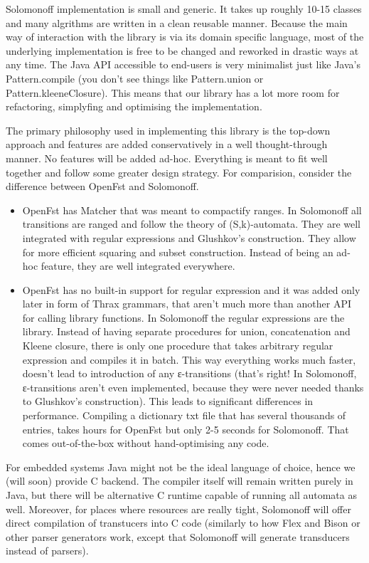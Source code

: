 \documentclass[oneside,polski,logo]{amuthesis}
\begin{document}
\begin{streszczenie}
Solomonoff implementation is small and generic. It takes up roughly 10-15 classes and many algrithms are written in a clean reusable manner. Because the main way of interaction with the library is via its domain specific language, most of the underlying implementation is free to be changed and reworked in drastic ways at any time. The Java API accessible to end-users is very minimalist just like Java's Pattern.compile (you don't see things like Pattern.union or Pattern.kleeneClosure). This means that our library has a lot more room for refactoring, simplyfing and optimising the implementation.


The primary philosophy used in implementing this library is the top-down approach and features are added conservatively in a well thought-through manner. No features will be added ad-hoc. Everything is meant to fit well together and follow some greater design strategy. For comparision, consider the difference between OpenFst and Solomonoff.


\begin{itemize}
	\item OpenFst has Matcher that was meant to compactify ranges. In Solomonoff all transitions are ranged and follow the theory of (S,k)-automata. They are well integrated with regular expressions and Glushkov's construction. They allow for more efficient squaring and subset construction. Instead of being an ad-hoc feature, they are well integrated everywhere.
	
	\item OpenFst has no built-in support for regular expression and it was added only later in form of Thrax grammars, that aren't much more than another API for calling library functions. In Solomonoff the regular expressions are the library. Instead of having separate procedures for union, concatenation and Kleene closure, there is only one procedure that takes arbitrary regular expression and compiles it in batch. This way everything works much faster, doesn't lead to introduction of any ε-transitions (that's right! In Solomonoff, ε-transitions aren't even implemented, because they were never needed thanks to Glushkov's construction). This leads to significant differences in performance. Compiling a dictionary txt file that has several thousands of entries, takes hours for OpenFst but only 2-5 seconds for Solomonoff. That comes out-of-the-box without hand-optimising any code.
	
\end{itemize}


For embedded systems Java might not be the ideal language of choice, hence we (will soon) provide C backend. The compiler itself will remain written purely in Java, but there will be alternative C runtime capable of running all automata as well. Moreover, for places where resources are really tight, Solomonoff will offer direct compilation of transtucers into C code (similarly to how Flex and Bison or other parser generators work, except that Solomonoff will generate transducers instead of parsers).



\end{streszczenie}
\end{document}
